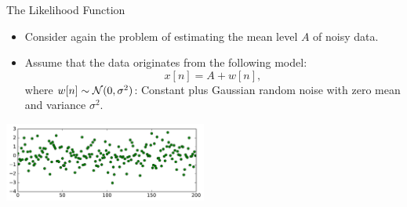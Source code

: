 \documentclass[10pt, aspectratio=169]{beamer} %
\begin{document}
\begin{frame}[allowframebreaks=0.8]{The Likelihood Function}
\begin{itemize}
\item Consider again the problem of estimating the mean level $A$ of noisy data.
\item Assume that the data originates from the following model:
\[
x[n] = A + w[n],
\]
where $w[n] \sim {\cal N}(0,\sigma^2)$: Constant plus Gaussian random noise with zero mean and variance $\sigma^2$.
\end{itemize}
\centerline{\includegraphics[width = 0.5\textwidth]{GaussianRV.pdf}}
\end{frame}
\end{document}
